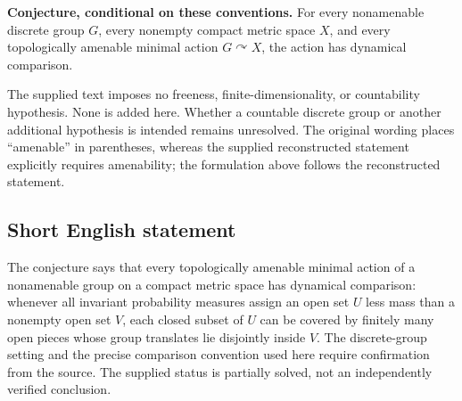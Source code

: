\documentclass[11pt]{article}
\begin{document}
\textbf{Conjecture, conditional on these conventions.} For every nonamenable discrete group \(G\), every nonempty compact metric space \(X\), and every topologically amenable minimal action \(G\curvearrowright X\), the action has dynamical comparison.

The supplied text imposes no freeness, finite-dimensionality, or countability hypothesis. None is added here. Whether a countable discrete group or another additional hypothesis is intended remains unresolved. The original wording places ``amenable'' in parentheses, whereas the supplied reconstructed statement explicitly requires amenability; the formulation above follows the reconstructed statement.
\subsection{Short English statement}
The conjecture says that every topologically amenable minimal action of a nonamenable group on a compact metric space has dynamical comparison: whenever all invariant probability measures assign an open set \(U\) less mass than a nonempty open set \(V\), each closed subset of \(U\) can be covered by finitely many open pieces whose group translates lie disjointly inside \(V\). The discrete-group setting and the precise comparison convention used here require confirmation from the source. The supplied status is partially solved, not an independently verified conclusion.
\end{document}
